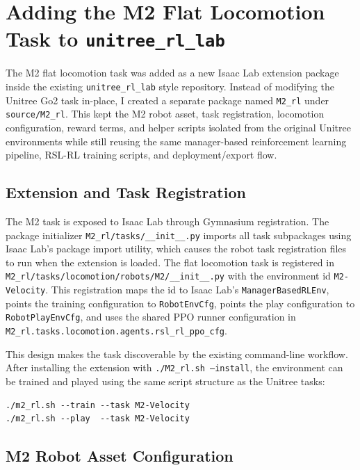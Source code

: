 \section{Adding the M2 Flat Locomotion Task to \texttt{unitree\_rl\_lab}}

The M2 flat locomotion task was added as a new Isaac Lab extension package inside the existing
\texttt{unitree\_rl\_lab} style repository. Instead of modifying the Unitree Go2 task in-place, I created
a separate package named \texttt{M2\_rl} under \texttt{source/M2\_rl}. This kept the M2 robot
asset, task registration, locomotion configuration, reward terms, and helper scripts isolated from the
original Unitree environments while still reusing the same manager-based reinforcement learning pipeline,
RSL-RL training scripts, and deployment/export flow.

\subsection{Extension and Task Registration}

The M2 task is exposed to Isaac Lab through Gymnasium registration. The package initializer
\texttt{M2\_rl/tasks/\_\_init\_\_.py} imports all task subpackages using Isaac Lab's package import
utility, which causes the robot task registration files to run when the extension is loaded. The flat
locomotion task is registered in
\texttt{M2\_rl/tasks/locomotion/robots/M2/\_\_init\_\_.py} with the environment id
\texttt{M2-Velocity}. This registration maps the id to Isaac Lab's
\texttt{ManagerBasedRLEnv}, points the training configuration to \texttt{RobotEnvCfg}, points the play
configuration to \texttt{RobotPlayEnvCfg}, and uses the shared PPO runner configuration in
\texttt{M2\_rl.tasks.locomotion.agents.rsl\_rl\_ppo\_cfg}.

This design makes the task discoverable by the existing command-line workflow. After installing the
extension with \texttt{./M2\_rl.sh --install}, the environment can be trained and played using the same
script structure as the Unitree tasks:

\begin{verbatim}
./m2_rl.sh --train --task M2-Velocity
./m2_rl.sh --play  --task M2-Velocity
\end{verbatim}

\subsection{M2 Robot Asset Configuration}

